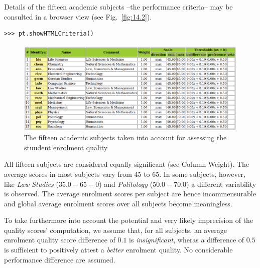 Details of the fifteen academic subjects --the performance criteria-- may be consulted in a browser view (see Fig.~\vref{fig:14.2}).
\begin{lstlisting}
>>> pt.showHTMLCriteria()
\end{lstlisting}
\begin{figure}[ht]
\includegraphics[width=\hsize]{Figures/14-2-spiegelCriteria.png}
\caption{The fifteen academic subjects taken into account for assessing the stuudent enrolment quality}
\label{fig:14.2}       %
\end{figure}

All fifteen subjects are considered equally significant (see Column Weight). The average scores in most subjects vary from 45 to 65. In some subjects, however, like \emph{Law Studies} ($35.0 - 65-0$) and \emph{Politology} ($50.0 - 70.0$) a different variability is observed. The average enrolment scores per subject are hence incommensurable and global average enrolment scores over all subjects become meaningless. 

To take furthermore into account the potential and very likely imprecision of the quality scores' computation, we assume that, for all subjects, an average enrolment quality score difference of $0.1$ is \emph{insignificant}, wheras a difference of $0.5$ is sufficient to positively attest a \emph{better} enrolment quality. No considerable performance difference are assumed.

